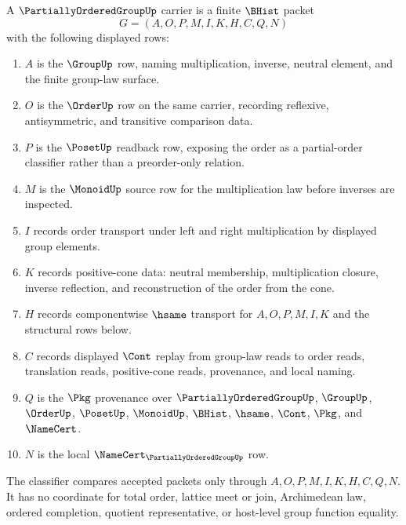 \begin{definition}
\label{def:partially-ordered-group-carrier}
A $\PartiallyOrderedGroupUp$ carrier is a finite $\BHist$ packet
$$
G=(A,O,P,M,I,K,H,C,Q,N)
$$
with the following displayed rows:
\begin{enumerate}
\item $A$ is the $\GroupUp$ row, naming multiplication, inverse, neutral element, and the finite group-law surface.
\item $O$ is the $\OrderUp$ row on the same carrier, recording reflexive, antisymmetric, and transitive comparison data.
\item $P$ is the $\PosetUp$ readback row, exposing the order as a partial-order classifier rather than a preorder-only relation.
\item $M$ is the $\MonoidUp$ source row for the multiplication law before inverses are inspected.
\item $I$ records order transport under left and right multiplication by displayed group elements.
\item $K$ records positive-cone data: neutral membership, multiplication closure, inverse reflection, and reconstruction of the order from the cone.
\item $H$ records componentwise $\hsame$ transport for $A,O,P,M,I,K$ and the structural rows below.
\item $C$ records displayed $\Cont$ replay from group-law reads to order reads, translation reads, positive-cone reads, provenance, and local naming.
\item $Q$ is the $\Pkg$ provenance over $\PartiallyOrderedGroupUp$, $\GroupUp$, $\OrderUp$, $\PosetUp$, $\MonoidUp$, $\BHist$, $\hsame$, $\Cont$, $\Pkg$, and $\NameCert$.
\item $N$ is the local $\NameCert_{\PartiallyOrderedGroupUp}$ row.
\end{enumerate}
The classifier compares accepted packets only through $A,O,P,M,I,K,H,C,Q,N$. It has no coordinate for total order, lattice meet or join, Archimedean law, ordered completion, quotient representative, or host-level group function equality.
\end{definition}

